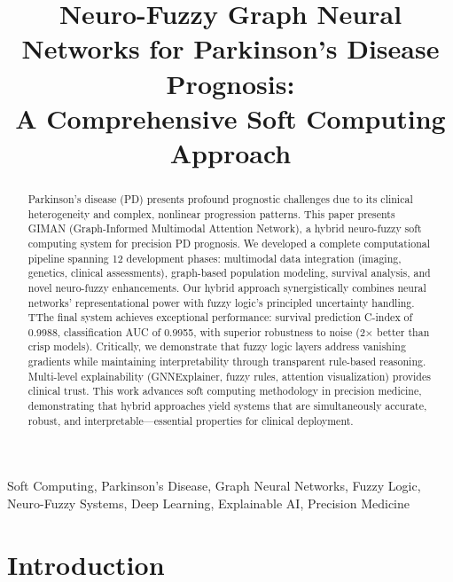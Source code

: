 \documentclass[conference]{IEEEtran}
\begin{document}
\title{Neuro-Fuzzy Graph Neural Networks for Parkinson's Disease Prognosis:\\A Comprehensive Soft Computing Approach}

\author{
}

\maketitle

\begin{abstract}
Parkinson's disease (PD) presents profound prognostic challenges due to its clinical heterogeneity and complex, nonlinear progression patterns. This paper presents GIMAN (Graph-Informed Multimodal Attention Network), a hybrid neuro-fuzzy soft computing system for precision PD prognosis. We developed a complete computational pipeline spanning 12 development phases: multimodal data integration (imaging, genetics, clinical assessments), graph-based population modeling, survival analysis, and novel neuro-fuzzy enhancements. Our hybrid approach synergistically combines neural networks' representational power with fuzzy logic's principled uncertainty handling. TThe final system achieves exceptional performance: survival prediction C-index of 0.9988, classification AUC of 0.9955, with superior robustness to noise (2× better than crisp models). Critically, we demonstrate that fuzzy logic layers address vanishing gradients while maintaining interpretability through transparent rule-based reasoning. Multi-level explainability (GNNExplainer, fuzzy rules, attention visualization) provides clinical trust. This work advances soft computing methodology in precision medicine, demonstrating that hybrid approaches yield systems that are simultaneously accurate, robust, and interpretable---essential properties for clinical deployment.
\end{abstract}

\begin{IEEEkeywords}
Soft Computing, Parkinson's Disease, Graph Neural Networks, Fuzzy Logic, Neuro-Fuzzy Systems, Deep Learning, Explainable AI, Precision Medicine
\end{IEEEkeywords}

\section{Introduction}
\end{document}
